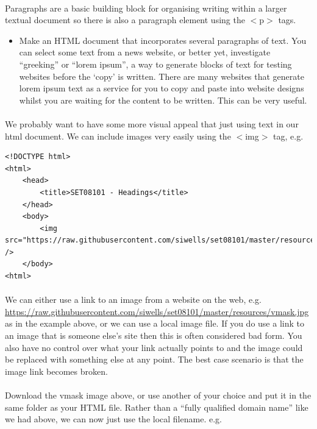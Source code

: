 \documentclass[10pt, a4paper, twosize]{article}
\begin{document}
\paragraph{} Paragraphs are a basic building block for organising writing within a larger textual document so there is also a paragraph element using the $<$p$>$ tags.

\begin{itemize}
\item Make an HTML document that incorporates several paragraphs of text. You can select some text from a news website, or better yet, investigate ``greeking'' or ``lorem ipsum'', a way to generate blocks of text for testing websites before the `copy' is written. There are many websites that generate lorem ipsum text as a service for you to copy and paste into website designs whilst you are waiting for the content to be written. This can be very useful.
\end{itemize}

\paragraph{} We probably want to have some more visual appeal that just using text in our html document. We can include images very easily using the $<$img$>$ tag, e.g.

\begin{lstlisting}
<!DOCTYPE html>
<html>
    <head>
        <title>SET08101 - Headings</title>
    </head>
    <body>
        <img src="https://raw.githubusercontent.com/siwells/set08101/master/resources/vmask.jpg" />      
    </body>
<html>
\end{lstlisting}

\paragraph{} We can either use a link to an image from a website on the web, e.g. \url{https://raw.githubusercontent.com/siwells/set08101/master/resources/vmask.jpg} as in the example above, or we can use a local image file. If you do use a link to an image that is someone else's site then this is often considered bad form. You also have no control over what your link actually points to and the image could be replaced with something else at any point. The best case scenario is that the image link becomes broken. 

\paragraph{} Download the vmask image above, or use another of your choice and put it in the same folder as your HTML file. Rather than a ``fully qualified domain name'' like we had above, we can now just use the local filename. e.g.
\end{document}
